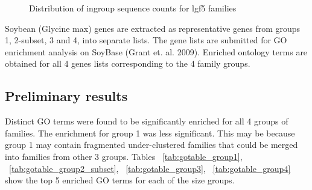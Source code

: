 \documentclass{article}
\begin{document}
		\begin{figure}[h!]
			\caption{Distribution of ingroup sequence counts for lgf5 families}
			\label{fig:hist_lgf5_family_size_groups}
		\end{figure}
	
		Soybean (Glycine max) genes are extracted as representative genes from groups 1, 2-subset, 3 and 4, into separate lists. The gene lists are submitted for GO enrichment analysis on SoyBase (Grant et. al. 2009). Enriched ontology terms are obtained for all 4 genes lists corresponding to the 4 family groups.
		
		\subsection{Preliminary results}
		Distinct GO terms were found to be significantly enriched for all 4 groups of families. The enrichment for group 1 was less significant. This may be because group 1 may contain fragmented under-clustered families that could be merged into families from other 3 groups. Tables ~\ref{tab:gotable_group1}, ~\ref{tab:gotable_group2_subset}, ~\ref{tab:gotable_group3}, ~\ref{tab:gotable_group4} show the top 5 enriched GO terms for each of the size groups.
		
\end{document}
